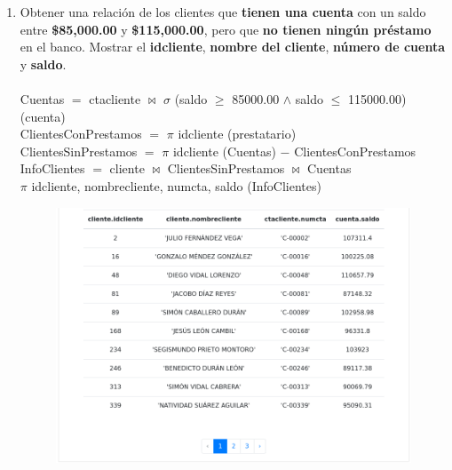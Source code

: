 \documentclass{exam}
\begin{document}
\begin{questions}
\begin{enumerate}[label=\alph*.]
		\newpage
		\item Obtener una relación de los clientes que \textbf{tienen una cuenta} con un saldo entre \textbf{\$85,000.00} y \textbf{\$115,000.00}, pero que \textbf{no tienen ningún préstamo} en el banco. Mostrar el \textbf{idcliente}, \textbf{nombre del cliente}, \textbf{número de cuenta} y \textbf{saldo}.\\\\
		Cuentas $=$ ctacliente $\bowtie$ $\sigma$ (saldo $\geqslant$ 85000.00 $\wedge$ saldo $\leqslant$ 115000.00) (cuenta)\\
		ClientesConPrestamos $=$ $\pi$ idcliente (prestatario)\\
		ClientesSinPrestamos $=$ $\pi$ idcliente (Cuentas) $-$ ClientesConPrestamos\\
		InfoClientes $=$ cliente $\bowtie$ ClientesSinPrestamos $\bowtie$ Cuentas\\
		$\pi$ idcliente, nombrecliente, numcta, saldo (InfoClientes)\\
		\begin{center}
		\begin{figure}[h!]
			\includegraphics[width=17cm]{imgs/2b.png}
			\centering
		\end{figure}	
		\end{center}
		

\end{enumerate}
\end{questions}
\end{document}
